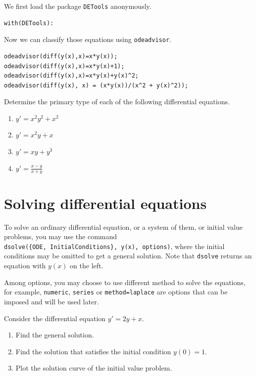 \documentclass[
  12pt]{elegantbook}
\begin{document}
\begin{solution}

We first load the package \texttt{DETools} anonymously.

\begin{verbatim}
with(DETools):
\end{verbatim}

Now we can classify those equations using \texttt{odeadvisor}.

\begin{verbatim}
odeadvisor(diff(y(x),x)=x*y(x));
odeadvisor(diff(y(x),x)=x*y(x)+1);
odeadvisor(diff(y(x),x)=x*y(x)+y(x)^2;
odeadvisor(diff(y(x), x) = (x*y(x))/(x^2 + y(x)^2));
\end{verbatim}

\end{solution}

\begin{exercise}

Determine the primary type of each of the following differential equations.

\begin{enumerate}
\def\labelenumi{\arabic{enumi}.}
\item
  \(y'=x^2y^2+x^2\)
\item
  \(y'=x^2y+x\)
\item
  \(y'=xy+y^3\)
\item
  \(y'=\frac{x-y}{x+y}\)
\end{enumerate}

\end{exercise}

\hypertarget{solving-differential-equations}{%
\section{Solving differential equations}\label{solving-differential-equations}}

To solve an ordinary differential equation, or a system of them, or initial value problems, you may use the command \texttt{dsolve(\{ODE,\ InitialConditions\},\ y(x),\ options)}, where the initial conditions may be omitted to get a general solution. Note that \texttt{dsolve} returns an equation with \(y(x)\) on the left.

Among options, you may choose to use different method to solve the equations, for example, \texttt{numeric}, \texttt{series} or \texttt{method=laplace} are options that can be imposed and will be used later.

\begin{example}

Consider the differential equation
\(y'=2y+x.\)

\begin{enumerate}
\def\labelenumi{\arabic{enumi}.}
\item
  Find the general solution.
\item
  Find the solution that satisfies the initial condition \(y(0)=1\).
\item
  Plot the solution curve of the initial value problem.
\end{enumerate}

\end{example}
\end{document}
